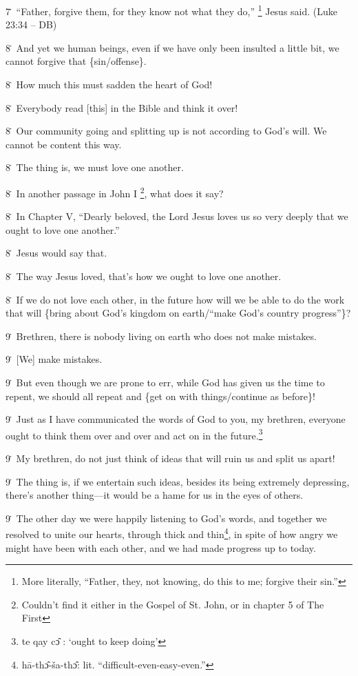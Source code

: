 7\. ``Father, forgive them, for they know not what they do,'' \footnote{More literally, ``Father, they, not knowing, do this to me; forgive their sin.''} Jesus said. (Luke
23:34 -- DB)

8\. And yet we human beings, even if we have only been insulted a little bit, we
cannot forgive that \{sin/offense\}.

8\. How much this must sadden the heart of God!

8\. Everybody read [this] in the Bible and think it over!

8\. Our community going and splitting up is not according to God's will. We cannot
be content this way.

8\. The thing is, we must love one another.

8\. In another passage in John I \footnote{Couldn't find it either in the Gospel of St. John, or in chapter 5 of The First}, what does it say?

8\. In Chapter V, ``Dearly beloved, the Lord Jesus loves us so very deeply that
we ought to love one another.''

8\. Jesus would say that.

8\. The way Jesus loved, that's how we ought to love one another.

8\. If we do not love each other, in the future how will we be able to do the work
that will \{bring about God's kingdom on earth/``make God's country progress''\}?

9\. Brethren, there is nobody living on earth who does not make mistakes.

9\. [We] make mistakes.

9\. But even though we are prone to err, while God has given us the time to repent,
we should all repeat and \{get on with things/continue as before\}!

9\. Just as I have communicated the words of God to you, my brethren, everyone
ought to think them over and over and act on in the future.\footnote{te qay cɔ̂ : `ought to keep doing'}

9\. My brethren, do not just think of ideas that will ruin us and split us apart!

9\. The thing is, if we entertain such ideas, besides its being extremely depressing,
there's another thing---it would be a hame for us in the eyes of others.

9\. The other day we were happily listening to God's words, and together we resolved
to unite our hearts, through thick and thin\footnote{hā-thɔ̂-ša-thɔ̂: lit. ``difficult-even-easy-even.''}, in spite of how angry we might
have been with each other, and we had made progress up to today.

